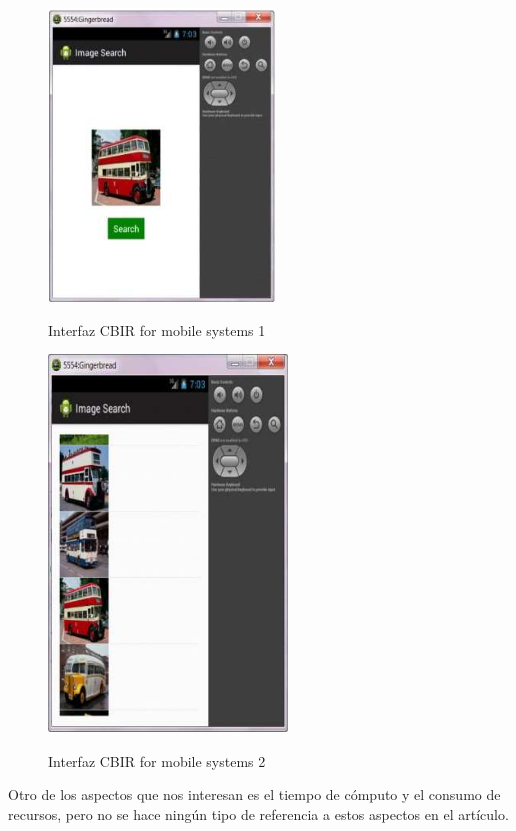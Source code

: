 \begin{figure}[H] %
\centering
\includegraphics[scale=0.6]{imagenes/articulo11.png}  %
\label{articulo11}
\caption{Interfaz CBIR for mobile systems 1}
\end{figure}

\begin{figure}[H] %
\centering
\includegraphics[scale=0.6]{imagenes/articulo12.png}  %
\label{articulo11}
\caption{Interfaz CBIR for mobile systems 2}
\end{figure}

Otro de los aspectos que nos interesan es el tiempo de cómputo y el consumo de recursos, pero no se hace ningún tipo de referencia a estos aspectos en el artículo.\\

